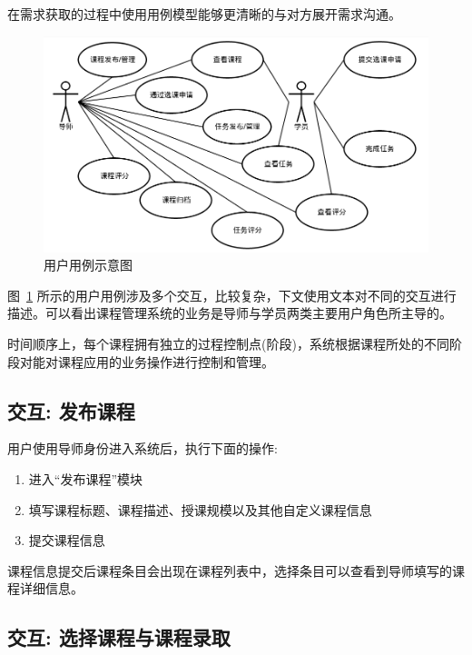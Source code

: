 在需求获取的过程中使用用例模型能够更清晰的与对方展开需求沟通。

\begin{figure}[!hbp]
  \begin{center}
    \includegraphics[scale=0.5]{figures/diagram-use-case.png}
    \caption{用户用例示意图\label{UseCase}}
  \end{center}
\end{figure}

图~\ref{UseCase} 所示的用户用例涉及多个交互，比较复杂，下文使用文本对不同的交互进行描述。可以看出课程管理系统的业务是导师与学员两类主要用户角色所主导的。

时间顺序上，每个课程拥有独立的过程控制点(阶段)，系统根据课程所处的不同阶段对能对课程应用的业务操作进行控制和管理。

\subsection {交互: 发布课程}

用户使用导师身份进入系统后，执行下面的操作:

\begin{enumerate}
  \item 进入“发布课程”模块
  \item 填写课程标题、课程描述、授课规模以及其他自定义课程信息
  \item 提交课程信息
\end{enumerate}

课程信息提交后课程条目会出现在课程列表中，选择条目可以查看到导师填写的课程详细信息。

\subsection {交互: 选择课程与课程录取}

